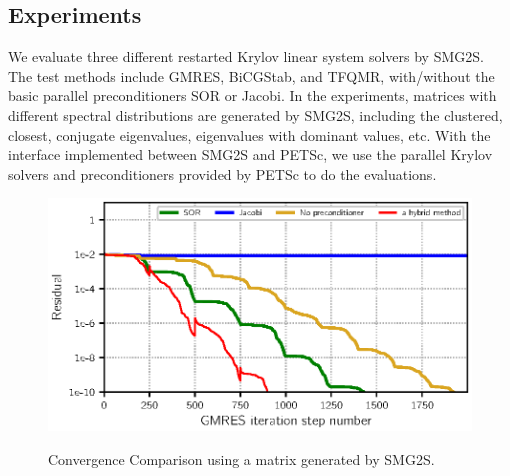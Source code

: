 \subsection{Experiments}

We evaluate three different restarted Krylov linear system solvers by SMG2S. The test methods include GMRES, BiCGStab, and TFQMR, with/without the basic parallel preconditioners SOR or Jacobi. In the experiments, matrices with different spectral distributions are generated by SMG2S, including the clustered, closest, conjugate eigenvalues, eigenvalues with dominant values, etc. With the interface implemented between SMG2S and PETSc, we use the parallel Krylov solvers and preconditioners provided by PETSc to do the evaluations.

\begin{figure}[t]
	\caption{Convergence Comparison using a matrix generated by SMG2S.}
	\centering
	\includegraphics[width=0.99\linewidth]{fig/smg2s_convergence.eps}
		\label{fig:smg2s-convergence}
\end{figure}


